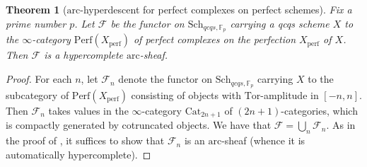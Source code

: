 \documentclass[reqno]{amsart}
\newcommand{\arc}{\mathrm{arc}}
\newtheorem{theorem}{Theorem}[section]
\theoremstyle{definition}
\begin{document}
\begin{theorem}[$\arc$-hyperdescent for perfect complexes on perfect schemes]
\label{archyp}
Fix a prime number $p$. Let $\mathcal{F}$ be the functor on
$\mathrm{Sch}_{qcqs,\mathbb{F}_p}$ carrying a qcqs scheme $X$ to the
$\infty$-category $\mathrm{Perf}(X_{\mathrm{perf}})$ of perfect complexes on the perfection $X_{\mathrm{perf}}$ of $X$. Then $\mathcal{F}$ is a hypercomplete $\arc$-sheaf.
\end{theorem}
\begin{proof}
For each $n$, let 
$\mathcal{F}_n$ denote the functor on $\mathrm{Sch}_{qcqs,\mathbb{F}_p}$ carrying $X$ to 
the subcategory of $\mathrm{Perf}(X_{\mathrm{perf}})$ consisting of objects with
$\mathrm{Tor}$-amplitude in $[-n, n]$. 
Then $\mathcal{F}_n$ takes values in the $\infty$-category 
$\mathrm{Cat}_{2n+1}$
of $(2n+1)$-categories, which is compactly generated by cotruncated objects. We have that
$\mathcal{F} = \bigcup_n \mathcal{F}_n$. 
As in the proof of , it suffices to show that $\mathcal{F}_n$
is an $\arc$-sheaf (whence it is automatically hypercomplete). 


\end{proof}
\end{document}
